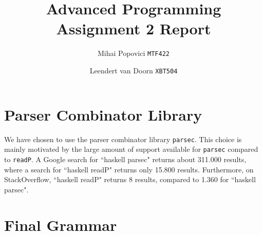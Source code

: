 \documentclass{article}
\title{Advanced Programming Assignment 2 Report}
\author{Mihai Popovici \texttt{MTF422} \and Leendert van Doorn \texttt{XBT504}}
\begin{document}
\maketitle




\section{Parser Combinator Library}
We have chosen to use the parser combinator library \texttt{parsec}. This choice is mainly motivated by the large amount of support available for \texttt{parsec} compared to \texttt{readP}. A Google search for ``haskell parsec" returns about 311.000 results, where a search for ``haskell readP" returns only 15.800 results. Furthermore, on StackOverflow, ``haskell readP" returns 8 results, compared to 1.360 for ``haskell parsec".

\section{Final Grammar}

\setlength{\grammarparsep}{4pt plus 1pt minus 1pt} %
\setlength{\grammarindent}{9em} %
\end{document}
